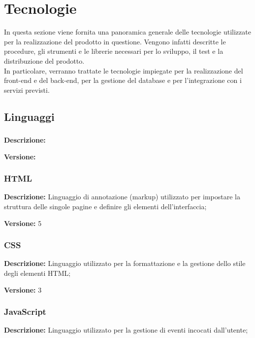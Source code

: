\section{Tecnologie}

In questa sezione viene fornita una panoramica generale delle tecnologie utilizzate per la
realizzazione del prodotto in questione. Vengono infatti descritte le procedure, gli strumenti e le
librerie necessari per lo sviluppo, il test e la distribuzione del prodotto.\\
In particolare, verranno trattate le tecnologie impiegate per la realizzazione del front-end e del back-end, per la gestione del
database e per l'integrazione con i servizi previsti.

\subsection{Linguaggi}

\subsubsection{}

\textbf{Descrizione:}

\textbf{Versione:}



\subsubsection{HTML}

\textbf{Descrizione:} Linguaggio di annotazione (markup) utilizzato per impostare la struttura delle
singole pagine e definire gli elementi dell’interfaccia;

\textbf{Versione:} 5


\subsubsection{CSS}

\textbf{Descrizione:} Linguaggio utilizzato per la formattazione e la gestione dello stile degli elementi HTML;

\textbf{Versione:} 3


\subsubsection{JavaScript}

\textbf{Descrizione:} Linguaggio utilizzato per la gestione di eventi incocati dall'utente;

